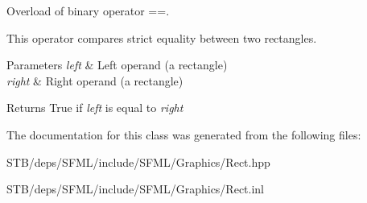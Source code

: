 Overload of binary operator ==. 

This operator compares strict equality between two rectangles.


\begin{DoxyParams}{Parameters}
{\em left} & Left operand (a rectangle) \\
\hline
{\em right} & Right operand (a rectangle)\\
\hline
\end{DoxyParams}
\begin{DoxyReturn}{Returns}
True if {\itshape left} is equal to {\itshape right} 
\end{DoxyReturn}


The documentation for this class was generated from the following files\+:\begin{DoxyCompactItemize}
\item 
S\+T\+B/deps/\+S\+F\+M\+L/include/\+S\+F\+M\+L/\+Graphics/Rect.\+hpp\item 
S\+T\+B/deps/\+S\+F\+M\+L/include/\+S\+F\+M\+L/\+Graphics/Rect.\+inl\end{DoxyCompactItemize}
